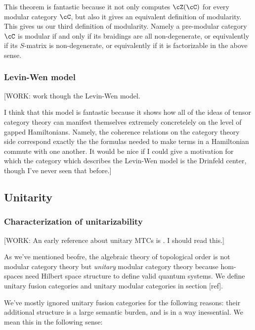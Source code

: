 This theorem is fantastic because it not only computes $\cZ(\cC)$ for every modular category $\cC$, but also it gives an equivalent definition of modularity. This gives us our third definition of modularity. Namely a pre-modular category $\cC$ is modular if and only if its braidings are all non-degenerate, or equivalently if its $S$-matrix is non-degenerate, or equivalently if it is factorizable in the above sense.

\subsubsection{Levin-Wen model}

[WORK: work though the Levin-Wen model.

I think that this model is fantastic because it shows how all of the ideas of tensor category theory can manifest themselves extremely concretelely on the level of gapped Hamiltonians. Namely, the coherence relations on the category theory side correspond exactly the the formulas needed to make terms in a Hamiltonian commute with one another. It would be nice if I could give a motivation for which the category which describes the Levin-Wen model is the Drinfeld center, though I've never seen that before.]




\subsection{Unitarity}

\subsubsection{Characterization of unitarizability}

[WORK: An early reference about unitary MTCs is \cite{kirillov1996inner}. I should read this.]

As we've mentioned beofre, the algebraic theory of topological order is not modular category theory but \textit{unitary} modular category theory because hom-spaces need Hilbert space structure to define valid quantum systems. We define unitary fusion categories and unitary modular categories in section [ref].

We've mostly ignored unitary fusion categories for the following reasons: their additional structure is a large semantic burden, and is in a way inessential. We mean this in the following sense:


